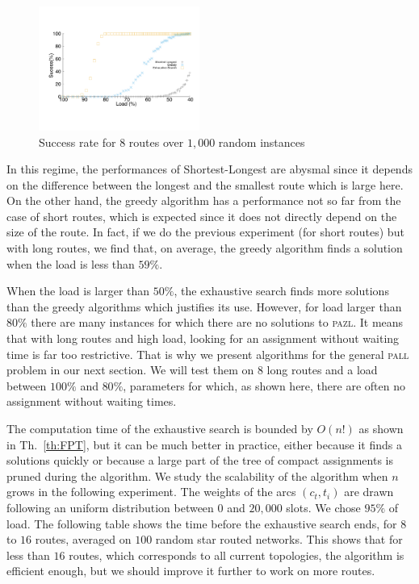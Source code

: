 \documentclass[10pt, conference, letterpaper]{IEEEtran}
\newcommand\pazl{\textsc{pazl}\xspace}
\newcommand\pall{\textsc{pall}\xspace}
\begin{document}
\begin{figure}[h]

       \begin{center}
      \includegraphics[width=0.47\textwidth]{echec_longues.pdf}
      \end{center}
       
      \caption{Success rate for $8$ routes over $1,000$ random instances}\label{fig:long}
     \end{figure}
      
      In this regime, the performances of Shortest-Longest are abysmal since it depends on the difference between the longest and the smallest route which is large here. On the other hand, the greedy algorithm has a performance not so far from the case of short routes, which is expected since it does not directly depend on the size of the route. In fact, if we do the previous experiment  (for short routes) but with long routes, we find that, on average, the greedy algorithm finds a solution when the load is less than $59\%$.
      
      When the load is larger than $50\%$, the exhaustive search finds more solutions than the greedy algorithms which justifies its use. However, for load larger than $80\%$ there are many instances for which there are no solutions to \pazl.
      It means that with long routes and high load, looking for an assignment without waiting time is far too restrictive. That is why we present algorithms for the general \pall problem in our next section. We will test them on $8$ long routes and a load between $100\%$ and $80\%$, parameters for which, as shown here, there are often no assignment without waiting times.
      
      The computation time of the exhaustive search is bounded by $O(n!)$ as shown in Th.~\ref{th:FPT}, 
      but it can be much better in practice, either because it finds a solutions quickly or because a large part of the tree of 
      compact assignments is pruned during the algorithm. We study the scalability  of the algorithm when $n$ grows in the following experiment. The weights of the arcs $(c_t,t_i)$ are drawn following an uniform distribution between $0$ and $20,000$ slots. We chose  $95\%$ of load.  The following table shows the time before the exhaustive search ends, for $8$ to $16$ routes, averaged on $100$ random star routed networks. This shows that for less than $16$ routes, which corresponds to all current topologies, the algorithm is efficient enough, but we should improve it further to work on more routes.
      
\end{document}
